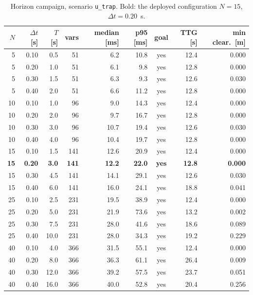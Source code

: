 \begin{table}[htbp]
  \centering
  \small
  \caption{Horizon campaign, scenario \texttt{u\_trap}. Bold: the deployed configuration $N=15$, $\Delta t=0.20$~s.}
  \label{res:tab:horizon:utrap}
  \begin{tabular}{rrrrrrcrr}
    \toprule
    $N$ & $\Delta t$ [s] & $T$ [s] & vars & median [ms] & p95 [ms] & goal & TTG [s] & min clear.\ [m] \\
    \midrule
    5 & 0.10 & 0.5 & 51 & 6.2 & 10.8 & yes & 12.4 & 0.000 \\
    5 & 0.20 & 1.0 & 51 & 6.1 & 9.8 & yes & 12.8 & 0.000 \\
    5 & 0.30 & 1.5 & 51 & 6.3 & 9.3 & yes & 12.6 & 0.030 \\
    5 & 0.40 & 2.0 & 51 & 6.6 & 11.2 & yes & 12.8 & 0.000 \\
    10 & 0.10 & 1.0 & 96 & 9.0 & 14.3 & yes & 12.4 & 0.000 \\
    10 & 0.20 & 2.0 & 96 & 9.7 & 16.7 & yes & 12.8 & 0.000 \\
    10 & 0.30 & 3.0 & 96 & 10.7 & 19.4 & yes & 12.6 & 0.030 \\
    10 & 0.40 & 4.0 & 96 & 10.4 & 19.7 & yes & 12.8 & 0.000 \\
    15 & 0.10 & 1.5 & 141 & 12.6 & 20.9 & yes & 12.4 & 0.000 \\
    \textbf{15} & \textbf{0.20} & \textbf{3.0} & \textbf{141} & \textbf{12.2} & \textbf{22.0} & \textbf{yes} & \textbf{12.8} & \textbf{0.000} \\
    15 & 0.30 & 4.5 & 141 & 14.1 & 29.1 & yes & 12.6 & 0.030 \\
    15 & 0.40 & 6.0 & 141 & 16.0 & 24.1 & yes & 18.8 & 0.041 \\
    25 & 0.10 & 2.5 & 231 & 19.5 & 38.9 & yes & 12.4 & 0.000 \\
    25 & 0.20 & 5.0 & 231 & 21.9 & 73.6 & yes & 13.2 & 0.002 \\
    25 & 0.30 & 7.5 & 231 & 28.0 & 41.6 & yes & 18.6 & 0.089 \\
    25 & 0.40 & 10.0 & 231 & 28.0 & 34.3 & yes & 19.2 & 0.229 \\
    40 & 0.10 & 4.0 & 366 & 31.5 & 55.1 & yes & 12.4 & 0.000 \\
    40 & 0.20 & 8.0 & 366 & 36.3 & 61.1 & yes & 26.4 & 0.009 \\
    40 & 0.30 & 12.0 & 366 & 39.2 & 57.5 & yes & 23.7 & 0.051 \\
    40 & 0.40 & 16.0 & 366 & 40.0 & 52.8 & yes & 20.4 & 0.256 \\
    \bottomrule
  \end{tabular}
\end{table}

